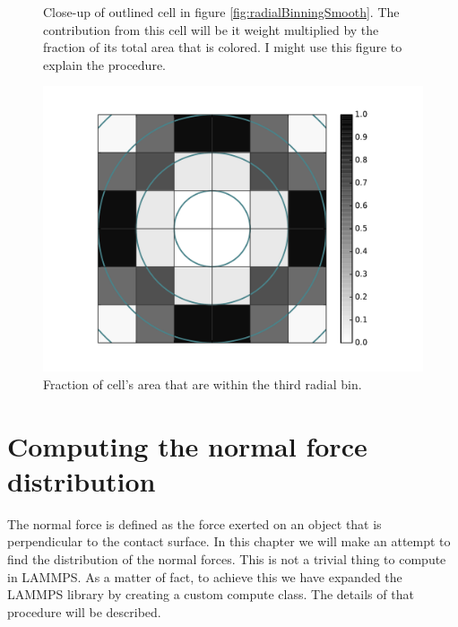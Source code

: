 \documentclass[twoside,english]{uiofysmaster}
\begin{document}
{\color{editColor}{\Huge Computing the area of the cell within the bin should be described here!}}


 
 
 

\begin{figure}
\begin{minipage}[t]{0.49\linewidth}
	\captionsetup{width=\textwidth}
	\resizebox{\linewidth}{!}{
		
	}
	\caption{Radial binning based on weighted contributions of intersecting cells. The third radial bin is colored, and its value will be the average of the intersecting cells weight times the fraction of the cells area that intersects the bin. A close-up of the outlined cell, is shown in figure \ref{fig:radialBinningSmoothCloseUp}.}
	\label{fig:radialBinningSmooth}
\end{minipage}
\quad
\begin{minipage}[t]{0.49\linewidth}
	\captionsetup{width=\textwidth}
	\resizebox{\linewidth}{!}{
		
	}
	\caption{Close-up of outlined cell in figure \ref{fig:radialBinningSmooth}. The contribution from this cell will be it weight multiplied by the fraction of its total area that is colored. I might use this figure to explain the procedure. }
	\label{fig:radialBinningSmoothCloseUp}
\end{minipage}
\end{figure}

\begin{figure}
	\centering
	\includegraphics[height=0.474\linewidth]{figures/forceDistribution/radialDistribution/weights.pdf}
	\caption{Fraction of cell's area that are within the third radial bin. }
	\label{fig:radialBinningWeights}
\end{figure}


\chapter{Computing the normal force distribution}
The normal force is defined as the force exerted on an object that is perpendicular to the contact surface. 
In this chapter we will make an attempt to find the distribution of the normal forces. 
This is not a trivial thing to compute in LAMMPS. 
As a matter of fact, to achieve this we have expanded the LAMMPS library by creating a custom compute class. 
The details of that procedure will be described. 
\end{document}
